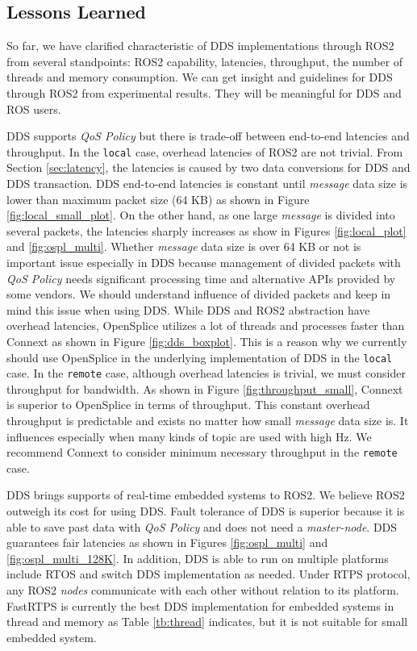 \documentclass{sig-alternate-05-2015}
\begin{document}
\vspace{-1mm}
\subsection{Lessons Learned}
\label{sec:lessons}
So far, we have clarified characteristic of DDS implementations through ROS2 from several standpoints: ROS2 capability, latencies, throughput, the number of threads and memory consumption.
We can get insight and guidelines for DDS through ROS2 from experimental results.
They will be meaningful for DDS and ROS users.

DDS supports \emph{QoS Policy} but there is trade-off between end-to-end latencies and throughput.
In the \texttt{local} case, overhead latencies of ROS2 are not trivial.
From Section \ref{sec:latency}, the latencies is caused by two data conversions for DDS and DDS transaction.
DDS end-to-end latencies is constant until \emph{message} data size is lower than maximum packet size (64 KB) as shown in Figure \ref{fig:local_small_plot}.
On the other hand, as one large \emph{message} is divided into several packets, the latencies sharply increases as show in Figures \ref{fig:local_plot} and \ref{fig:ospl_multi}.
Whether \emph{message} data size is over 64 KB or not is important issue especially in DDS because management of divided packets with \emph{QoS Policy} needs significant processing time and alternative APIs provided by some vendors.
We should understand influence of divided packets and keep in mind this issue when using DDS.
While DDS and ROS2 abstraction have overhead latencies, OpenSplice utilizes a lot of threads and processes faster than Connext as shown in Figure \ref{fig:dds_boxplot}.
This is a reason why we currently should use OpenSplice in the underlying implementation of DDS in the \texttt{local} case.
In the \texttt{remote} case, although overhead latencies is trivial, we must consider throughput for bandwidth.
As shown in Figure \ref{fig:throughput_small}, Connext is superior to OpenSplice in terms of throughput.
This constant overhead throughput is predictable and exists no matter how small \emph{message} data size is.
It influences especially when many kinds of topic are used with high Hz.
We recommend Connext to consider minimum necessary throughput in the \texttt{remote} case.

DDS brings supports of real-time embedded systems to ROS2.
We believe ROS2 outweigh its cost for using DDS.
Fault tolerance of DDS is superior because it is able to save past data with \emph{QoS Policy} and does not need a \emph{master-node}.
DDS guarantees fair latencies as shown in Figures \ref{fig:ospl_multi} and \ref{fig:ospl_multi_128K}.
In addition, DDS is able to run on multiple platforms include RTOS and switch DDS implementation as needed.
Under RTPS protocol, any ROS2 \emph{nodes} communicate with each other without relation to its platform.
FastRTPS is currently the best DDS implementation for embedded systems in thread and memory as Table \ref{tb:thread} indicates, but it is not suitable for small embedded system.
\end{document}
